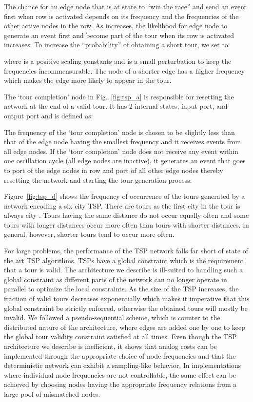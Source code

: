 \documentclass[10pt]{article}
\begin{document}
The chance for an edge node  that is at state  to ``win the race'' and send an event first when row  is activated depends on its frequency   and the frequencies of the other active nodes in the row. As  increases, the likelihood for edge node  to generate an event first and become part of the tour when its row is activated increases. To increase the ``probability'' of obtaining a short tour, we set  to:

where  is a positive scaling constants and  is a small perturbation to keep the frequencies incommensurable. The node of a shorter edge has a higher frequency which makes the edge more likely to appear in the tour. 

The `tour completion' node in Fig.~\ref{fig:tsp_a} is responsible for resetting the network at the end of a valid tour. It has 2 internal states,  input port, and  output port and is defined as: 

The frequency of the `tour completion' node is chosen to be slightly less than that of the edge node having the smallest frequency and it receives events from all edge nodes. If the `tour completion' node does not receive any event within one oscillation cycle (all edge nodes are inactive), it generates an event that goes to port  of the edge nodes in row  and port  of all other edge nodes thereby resetting the network and starting the tour generation process. 

Figure~\ref{fig:tsp_d} shows the frequency of occurrence of the tours generated by a network encoding a six city TSP. There are  tours as the first city in the tour is always city . Tours having the same distance do not occur equally often and some tours with longer distances occur more often than tours with shorter distances. In general, however, shorter tours tend to occur more often. 

For large problems, the performance of the TSP network falls far short of state of the art TSP algorithms. TSPs have a global constraint which is the requirement that a tour is valid. The architecture we describe is ill-suited to handling such a global constraint as different parts of the network can no longer operate in parallel to optimize the local constraints. As the size of the TSP increases, the fraction of valid tours decreases exponentially which makes it imperative that this global constraint be strictly enforced, otherwise the obtained tours will mostly be invalid. We followed a pseudo-sequential scheme, which is counter to the distributed nature of the architecture, where edges are added one by one to keep the global tour validity constraint satisfied at all times. Even though the TSP architecture we describe is inefficient, it shows that analog costs can be implemented through the appropriate choice of node frequencies and that the deterministic network can exhibit a sampling-like behavior. In implementations where individual node frequencies are not controllable, the same effect can be achieved by choosing nodes having the appropriate frequency relations from a large pool of mismatched nodes. 
\end{document}
